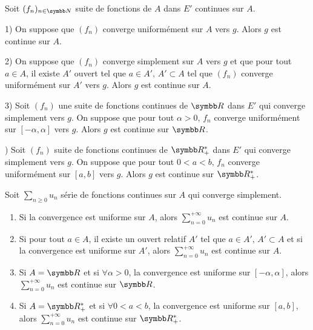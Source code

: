 \begin{theoreme}{}{}
    Soit $(f_n)_{n \in \N}$ suite de fonctions de $A$ dans $E'$ continues sur $A$. 
    
    1) On suppose que $(f_n)$ converge uniformément sur $A$ vers $g$. Alors $g$ est continue sur $A$.


    2) On suppose que $(f_n)$ converge simplement sur $A$ vers $g$ et que pour tout $a \in A$,
    il existe $A'$ ouvert tel que $a \in A', \, A' \subset A$ tel que $(f_n)$ converge uniformément sur $A'$ vers $g$.
    Alors $g$ est continue sur $A$.


    3) Soit $(f_n)$ une suite de fonctions continues de $\R$ dans $E'$ qui converge simplement vers $g$. 
    On suppose que pour tout $\alpha > 0, \, f_n$ converge uniformément sur $[-\alpha, \alpha]$ vers $g$.
    Alors $g$ est continue sur $\R$.

    ) Soit $(f_n)$ suite de fonctions continues de $\R_+^*$ dans $E'$ qui converge simplement vers $g$. 
    On suppose que pour tout $0<a<b, \, f_n$ converge uniformément sur $[a, b]$ vers $g$.
    Alors $g$ est continue sur $\R_+^*$.
\end{theoreme}

\begin{theoreme}{}{}
    Soit $\sum_{n \geqslant 0 } u_n$ série de fonctions continues sur $A$ qui converge 
    simplement. 

    \begin{enumerate}
        \item Si la convergence est uniforme sur $A$, alors $\displaystyle \sum_{n = 0}^{+ \infty} u_n$ est continue sur $A$.
        \item Si pour tout $a \in A$, il existe un ouvert relatif $A'$ tel que $a \in A', \, A' \subset A$ et
        si la convergence est uniforme sur $A'$, alors $\displaystyle \sum_{n = 0}^{+ \infty} u_n$ est continue sur $A$.
        \item Si $A = \R$ et si $\forall \alpha > 0$, la convergence est uniforme sur $[-\alpha, \alpha]$, 
        alors $\displaystyle \sum_{n = 0}^{+ \infty} u_n$ est continue sur $\R$.
        \item Si $A = \R_+^*$ et si $\forall 0 < a < b$, la convergence est uniforme sur $[a, b]$,
        alors $\displaystyle \sum_{n = 0}^{+ \infty} u_n$ est continue sur $\R_+^*$.
    \end{enumerate}
\end{theoreme}

